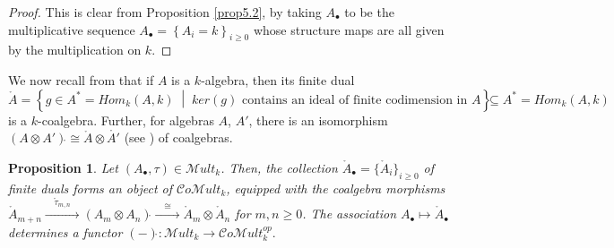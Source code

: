 \documentclass[10pt, colorlinks]{article}
\numberwithin{equation}{section} \DeclareMathSizes{2}{10}{12}{13}
\newtheorem{thm}{Proposition}[section]
\begin{document}
    
    \begin{proof}
This is clear from Proposition \ref{prop5.2}, by taking $A_\bullet$ to be the  
 multiplicative sequence $A_\bullet=\left\{A_i=k\right\}_{i\geq 0}$ whose structure maps are all given by the multiplication on $k$. 

    \end{proof}




    
    We now recall from \cite[Proposition 6.0.2]{SW} that if $A$ is a $k$-algebra, then its finite dual 
\begin{equation} \mathring{A}=\left\{g\in A^*=Hom_k(A,k)\;\middle|\; ker(g)\mbox{ contains an ideal of finite codimension in $A$} \right\}\subseteq A^*=Hom_k(A,k)
\end{equation} is a $k$-coalgebra. Further, for  algebras $A$, $A'$, there is an isomorphism $(A\otimes A')\mathring{}\cong\mathring{A}\otimes \mathring{A'}$  (see \cite[Lemma 6.0.1]{SW} ) of coalgebras.


    
      \begin{thm}\label{prop5.4}
        Let $(A_\bullet,\tau)\in \mathscr Mult_k$. Then, the collection $\mathring{A}_\bullet=\{\mathring{A}_i\}_{i\geq 0}$ of finite duals forms an object of $\mathcal Co\mathscr Mult_k$, equipped with the coalgebra morphisms
       $\mathring{A}_{m+n}\xrightarrow{\quad\mathring{\tau}_{m,n}\quad} ({A}_m\otimes A_n)\mathring{}\xrightarrow{\quad\cong\quad}  \mathring{A}_m\otimes  \mathring{A}_n $ for $m,n\geq 0$. The association  $A_\bullet\longmapsto \mathring{A}_\bullet$ determines a functor $(-)\mathring{}:\mathscr Mult_k\longrightarrow \mathcal Co\mathscr Mult_k^{op}.$ 
    \end{thm}
\end{document}

